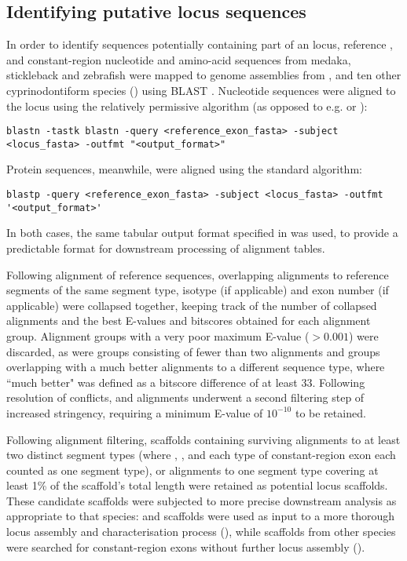 \subsection{Identifying putative locus sequences}
\label{sec:locus_scaffolds}

In order to identify sequences potentially containing part of an \igh{} locus, reference \vh, \jh and constant-region nucleotide and amino-acid sequences from medaka, stickleback and zebrafish were mapped to genome assemblies from \Nfu, \Xma and ten other cyprinodontiform species () using BLAST \parencite{altschul1990blast,altschul1997blast}. Nucleotide sequences were aligned to the locus using the relatively permissive  algorithm (as opposed to e.g.  or ):

\begin{lstlisting}
blastn -tastk blastn -query <reference_exon_fasta> -subject <locus_fasta> -outfmt "<output_format>"
\end{lstlisting}

Protein sequences, meanwhile, were aligned using the standard  algorithm:

\begin{lstlisting}
blastp -query <reference_exon_fasta> -subject <locus_fasta> -outfmt '<output_format>'
\end{lstlisting}

In both cases, the same tabular output format specified in  was used, to provide a predictable format for downstream processing of  alignment tables.

Following alignment of reference sequences, overlapping alignments to reference segments of the same segment type, isotype (if applicable) and exon number (if applicable) were collapsed together, keeping track of the number of collapsed alignments and the best E-values and bitscores obtained for each alignment group. Alignment groups with a very poor maximum E-value ($> 0.001$) were discarded, as were groups consisting of fewer than two alignments and groups overlapping with a much better alignments to a different sequence type, where ``much better" was defined as a bitscore difference of at least 33. Following resolution of conflicts, \vh and \ch alignments underwent a second filtering step of increased stringency, requiring a minimum E-value of $10^{-10}$ to be retained. 

Following alignment filtering, scaffolds containing surviving alignments to at least two distinct segment types (where \vh, \jh, and each type of constant-region exon each counted as one segment type), or alignments to one segment type covering at least 1\% of the scaffold's total length were retained as potential locus scaffolds. These candidate scaffolds were subjected to more precise downstream analysis as appropriate to that species: \Nfu and \Xma scaffolds were used as input to a more thorough locus assembly and characterisation process (), while scaffolds from other species were searched for constant-region exons without further locus assembly ().

